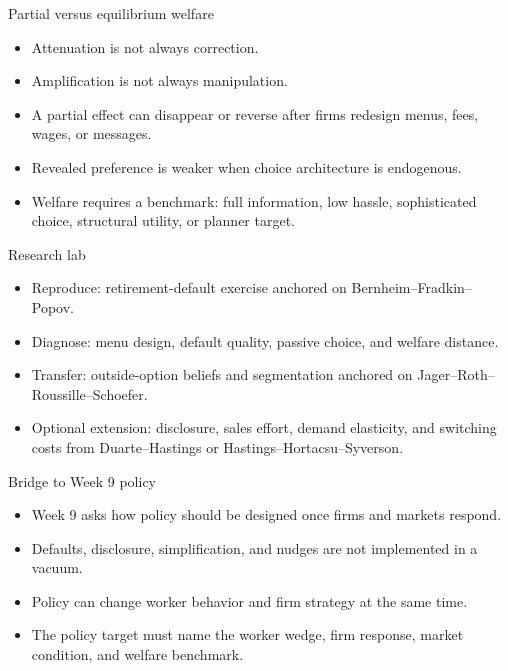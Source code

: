 \documentclass[aspectratio=169,11pt]{beamer}
\begin{document}
\begin{frame}{Partial versus equilibrium welfare}
\begin{itemize}
    \item Attenuation is not always correction.
    \item Amplification is not always manipulation.
    \item A partial effect can disappear or reverse after firms redesign menus, fees, wages, or messages.
    \item Revealed preference is weaker when choice architecture is endogenous.
    \item Welfare requires a benchmark: full information, low hassle, sophisticated choice, structural utility, or planner target.
\end{itemize}
\end{frame}

\begin{frame}{Research lab}
\begin{itemize}
    \item Reproduce: retirement-default exercise anchored on Bernheim--Fradkin--Popov.
    \item Diagnose: menu design, default quality, passive choice, and welfare distance.
    \item Transfer: outside-option beliefs and segmentation anchored on Jager--Roth--Roussille--Schoefer.
    \item Optional extension: disclosure, sales effort, demand elasticity, and switching costs from Duarte--Hastings or Hastings--Hortacsu--Syverson.
\end{itemize}
\end{frame}

\begin{frame}{Bridge to Week 9 policy}
\begin{itemize}
    \item Week 9 asks how policy should be designed once firms and markets respond.
    \item Defaults, disclosure, simplification, and nudges are not implemented in a vacuum.
    \item Policy can change worker behavior and firm strategy at the same time.
    \item The policy target must name the worker wedge, firm response, market condition, and welfare benchmark.
\end{itemize}
\end{frame}
\end{document}
